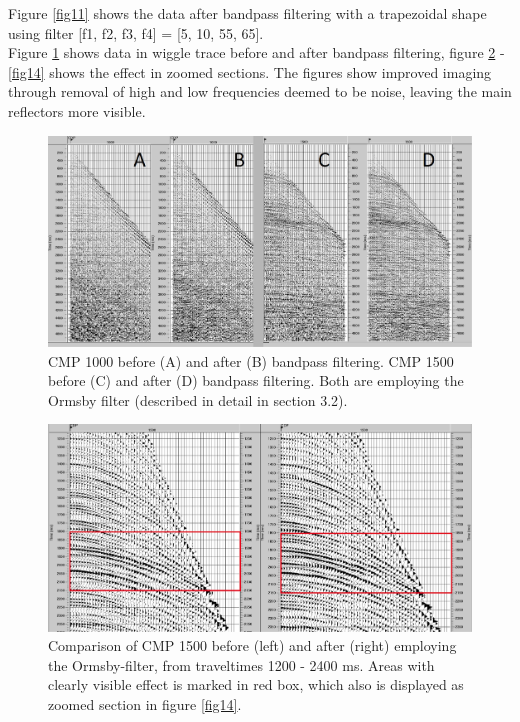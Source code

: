 \documentclass[10pt,a4paper]{article}
\begin{document}
\noindent Figure \ref{fig11} shows the data after bandpass filtering with a trapezoidal shape using filter [f1, f2, f3, f4] = [5, 10, 55, 65].
\\
Figure \ref{fig12} shows data in wiggle trace before and after bandpass filtering, figure \ref{fig13} - \ref{fig14} shows the effect in zoomed sections. The figures show improved imaging through removal of high and low frequencies deemed to be noise, leaving the main reflectors more visible.

\begin{figure}[H]
\includegraphics[width=\textwidth]{fig12.jpg}
\caption{CMP 1000 before (A) and after (B) bandpass filtering. CMP 1500 before (C) and after (D) bandpass filtering. Both are employing the Ormsby filter (described in detail in section 3.2).}
\label{fig12}
\end{figure}

\begin{figure}[H]
\includegraphics[width=\textwidth]{fig13.jpg}
\caption{Comparison of CMP 1500 before (left) and after (right) employing the Ormsby-filter, from traveltimes 1200 - 2400 ms. Areas with clearly visible effect is marked in red box, which also is displayed as zoomed section in figure \ref{fig14}.}
\label{fig13}
\end{figure}
\end{document}
